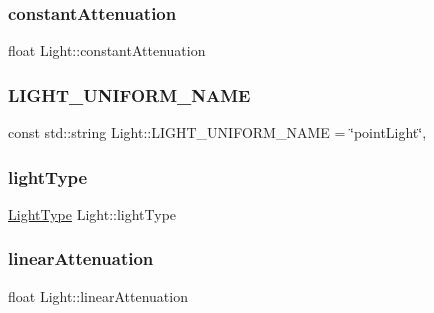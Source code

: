 \subsubsection{\texorpdfstring{constant\+Attenuation}{constantAttenuation}}
{\footnotesize\ttfamily float Light\+::constant\+Attenuation\hspace{0.3cm}{\ttfamily [private]}}

\hypertarget{class_light_ab2d40f6c364cf728d03a90ff885e37cb}{}\label{class_light_ab2d40f6c364cf728d03a90ff885e37cb}
\subsubsection{\texorpdfstring{L\+I\+G\+H\+T\+\_\+\+U\+N\+I\+F\+O\+R\+M\+\_\+\+N\+A\+ME}{LIGHT\_UNIFORM\_NAME}}
{\footnotesize\ttfamily const std\+::string Light\+::\+L\+I\+G\+H\+T\+\_\+\+U\+N\+I\+F\+O\+R\+M\+\_\+\+N\+A\+ME = \char`\"{}point\+Light\char`\"{}\hspace{0.3cm}{\ttfamily [static]}, {\ttfamily [private]}}

\hypertarget{class_light_ab0c279c927973443f7b52fc924b489aa}{}\label{class_light_ab0c279c927973443f7b52fc924b489aa}
\subsubsection{\texorpdfstring{light\+Type}{lightType}}
{\footnotesize\ttfamily \hyperlink{class_light_a661d9480e01af8b1612860b9630ef5f8}{Light\+Type} Light\+::light\+Type\hspace{0.3cm}{\ttfamily [private]}}

\hypertarget{class_light_afcb2da592197efae015ae16c1c5bfceb}{}\label{class_light_afcb2da592197efae015ae16c1c5bfceb}
\subsubsection{\texorpdfstring{linear\+Attenuation}{linearAttenuation}}
{\footnotesize\ttfamily float Light\+::linear\+Attenuation\hspace{0.3cm}{\ttfamily [private]}}

